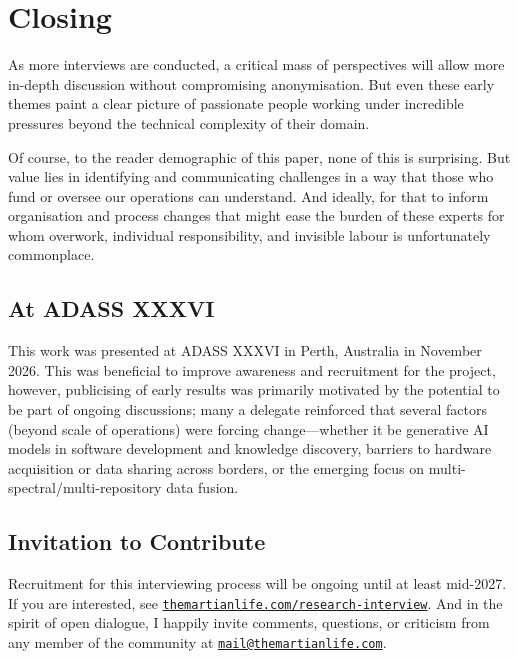 \documentclass[11pt,twoside]{article}
\begin{document}
\section{Closing}

As more interviews are conducted, a critical mass of perspectives will allow more in-depth discussion without compromising anonymisation. But even these early themes paint a clear picture of passionate people working under incredible pressures beyond the technical complexity of their domain.

Of course, to the reader demographic of this paper, none of this is surprising. But value lies in identifying and communicating challenges in a way that those who fund or oversee our operations can understand. And ideally, for that to inform organisation and process changes that might ease the  burden of these experts for whom overwork, individual responsibility, and invisible labour is unfortunately commonplace.

\subsection{At ADASS XXXVI}

This work was presented at ADASS XXXVI in Perth, Australia in November 2026. This was beneficial to improve awareness and recruitment for the project, however, publicising of early results was primarily motivated by the potential to be part of ongoing discussions; many a delegate reinforced that several factors (beyond scale of operations) were forcing change---whether it be generative AI models in software development and knowledge discovery, barriers to hardware acquisition or data sharing across borders, or the emerging focus on multi-spectral/multi-repository data fusion.

\subsection{Invitation to Contribute}

Recruitment for this interviewing process will be ongoing until at least mid-2027. If you are interested, see \href{https://themartianlife.com/research-interview}{\texttt{themartianlife.com/research-interview}}. And in the spirit of open dialogue, I happily invite comments, questions, or criticism from any member of the community at \href{mailto:mail@themartianlife.com}{\texttt{mail@themartianlife.com}}.



\end{document}
